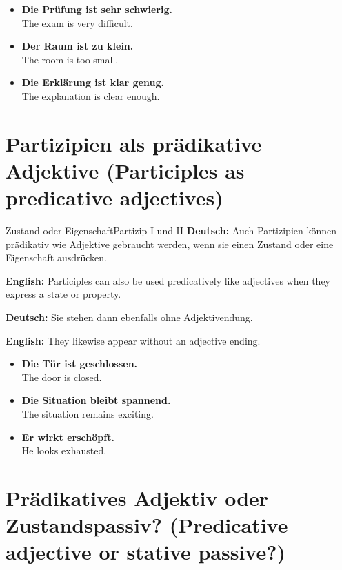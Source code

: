 \documentclass[a4paper,11pt]{article}
\newcommand{\GermanText}[1]{\textbf{Deutsch: }#1\par}
\newcommand{\EnglishText}[1]{{\small\color{SoftGray}\textbf{English: }#1\par}}
\newcommand{\ExampleItem}[2]{\item \textbf{#1}\\{\small\color{SoftGray}#2}}
\begin{document}
        \begin{exbox}
            \begin{itemize}
                \ExampleItem{Die Prüfung ist sehr schwierig.}{The exam is very difficult.}
                \ExampleItem{Der Raum ist zu klein.}{The room is too small.}
                \ExampleItem{Die Erklärung ist klar genug.}{The explanation is clear enough.}
            \end{itemize}
        \end{exbox}

    \section{Partizipien als prädikative Adjektive \textnormal{(Participles as predicative adjectives)}}

        \begin{grammarentry}{Zustand oder Eigenschaft}{Partizip I und II}
            \GermanText{Auch Partizipien können prädikativ wie Adjektive gebraucht werden, wenn sie einen Zustand oder eine Eigenschaft ausdrücken.}
            \EnglishText{Participles can also be used predicatively like adjectives when they express a state or property.}

            \GermanText{Sie stehen dann ebenfalls ohne Adjektivendung.}
            \EnglishText{They likewise appear without an adjective ending.}
        \end{grammarentry}

        \begin{exbox}
            \begin{itemize}
                \ExampleItem{Die Tür ist geschlossen.}{The door is closed.}
                \ExampleItem{Die Situation bleibt spannend.}{The situation remains exciting.}
                \ExampleItem{Er wirkt erschöpft.}{He looks exhausted.}
            \end{itemize}
        \end{exbox}

    \section{Prädikatives Adjektiv oder Zustandspassiv? \textnormal{(Predicative adjective or stative passive?)}}
\end{document}
